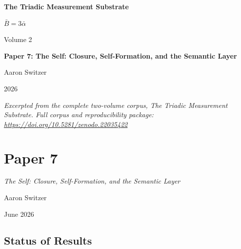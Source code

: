 \documentclass[11pt,oneside]{report}
\theoremstyle{definition}
\theoremstyle{remark}
\begin{document}
\thispagestyle{empty}
\begin{titlepage}
\centering
\vspace*{2cm}
{\sffamily\bfseries\Large The Triadic Measurement Substrate\par}
\vspace{0.6cm}
{\large $\bar{B} = 3\bar{\alpha}$\par}
\vspace{1cm}
{\sffamily\large Volume 2\par}
\vspace{1.4cm}
{\Large \bfseries Paper 7: The Self: Closure, Self-Formation, and the Semantic Layer\par}
\vfill
{\large Aaron Switzer\par}
\vspace{0.4cm}
{\large 2026\par}
\vspace{1.2cm}
{\small\itshape Excerpted from the complete two-volume corpus, \emph{The Triadic Measurement Substrate}. Full corpus and reproducibility package: \url{https://doi.org/10.5281/zenodo.22035422}\par}
\end{titlepage}
\cleardoublepage
{}

\chapter*{Paper 7}
\begingroup\centering
{\large\itshape The Self: Closure, Self-Formation, and the Semantic Layer\par}\vspace{0.8em}
{\normalsize Aaron Switzer\par}
{\small June 2026\par}
\endgroup\vspace{1.0em}

\par\vspace{0.6em}

\section*{Status of Results}
\end{document}
